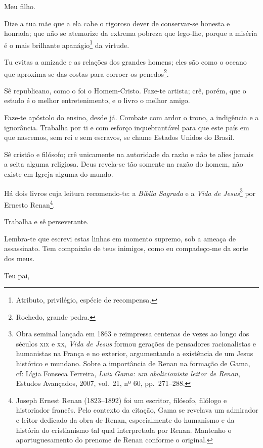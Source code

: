 {Meu filho.

Dize a tua mãe que a ela cabe o rigoroso dever de conservar-se honesta e
honrada; que não se atemorize da extrema pobreza que lego-lhe, porque a
miséria é o mais brilhante apanágio\footnote{ Atributo, privilégio,
  espécie de recompensa.} da virtude.

Tu evitas a amizade e as relações dos grandes homens; eles são como o
oceano que aproxima-se das costas para corroer os penedos\footnote{
  Rochedo, grande pedra.}.

Sê republicano, como o foi o Homem-Cristo. Faze-te artista; crê, porém,
que o estudo é o melhor entretenimento, e o livro o melhor amigo.

Faze-te apóstolo do ensino, desde já. Combate com ardor o trono, a
indigência e a ignorância. Trabalha por ti e com esforço inquebrantável
para que este país em que nascemos, sem rei e sem escravos, se chame
Estados Unidos do Brasil.

Sê cristão e filósofo; crê unicamente na autoridade da razão e não te
alies jamais a seita alguma religiosa. Deus revela-se tão somente na
razão do homem, não existe em Igreja alguma do mundo.

Há dois livros cuja leitura recomendo-te: a \emph{Bíblia Sagrada} e a
\emph{Vida de Jesus}\footnote{Obra seminal lançada em 1863 e
  reimpressa centenas de vezes ao longo dos séculos \textsc{xix} e \textsc{xx}, \emph{Vida
  de Jesus} formou gerações de pensadores racionalistas e humanistas na
  França e no exterior, argumentando a existência de um Jesus histórico
  e mundano. Sobre a importância de Renan na formação de Gama, cf: Lígia
  Fonseca Ferreira, \emph{Luiz Gama: um abolicionista leitor de Renan},
  Estudos Avançados, 2007, vol.~21, nº 60, pp.~271--288.} por Ernesto
Renan\footnote{ Joseph Ernest Renan (1823--1892) foi um escritor,
  filósofo, filólogo e historiador francês. Pelo contexto da citação,
  Gama se revelava um admirador e leitor dedicado da obra de Renan,
  especialmente do humanismo e da história do cristianismo tal qual
  interpretada por Renan. Mantenho o aportuguesamento do prenome de
  Renan conforme o original.}.

Trabalha e sê perseverante.

Lembra-te que escrevi estas linhas em momento supremo, sob a ameaça de
assassinato. Tem compaixão de teus inimigos, como eu compadeço-me da
sorte dos meus.

\begin{flushright}
Teu pai,


\end{flushright}}
